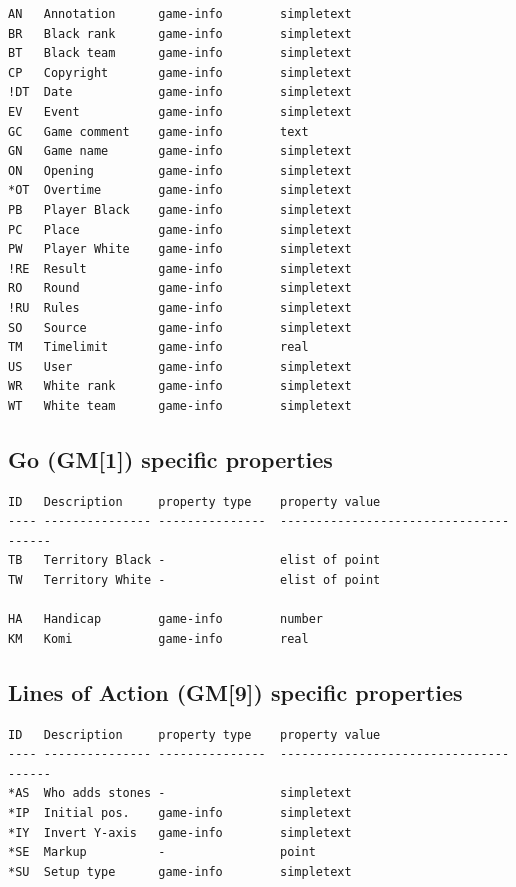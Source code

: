 \begin{verbatim}
AN   Annotation      game-info        simpletext
BR   Black rank      game-info        simpletext
BT   Black team      game-info        simpletext
CP   Copyright       game-info        simpletext
!DT  Date            game-info        simpletext
EV   Event           game-info        simpletext
GC   Game comment    game-info        text
GN   Game name       game-info        simpletext
ON   Opening         game-info        simpletext
*OT  Overtime        game-info        simpletext
PB   Player Black    game-info        simpletext
PC   Place           game-info        simpletext
PW   Player White    game-info        simpletext
!RE  Result          game-info        simpletext
RO   Round           game-info        simpletext
!RU  Rules           game-info        simpletext
SO   Source          game-info        simpletext
TM   Timelimit       game-info        real
US   User            game-info        simpletext
WR   White rank      game-info        simpletext
WT   White team      game-info        simpletext
\end{verbatim}

\subsection{Go (GM{[}1{]}) specific
properties}\label{go-gm1-specific-properties}

\begin{verbatim}
ID   Description     property type    property value
---- --------------- ---------------  --------------------------------------
TB   Territory Black -                elist of point
TW   Territory White -                elist of point

HA   Handicap        game-info        number
KM   Komi            game-info        real
\end{verbatim}

\subsection{Lines of Action (GM{[}9{]}) specific
properties}\label{lines-of-action-gm9-specific-properties}

\begin{verbatim}
ID   Description     property type    property value
---- --------------- ---------------  --------------------------------------
*AS  Who adds stones -                simpletext
*IP  Initial pos.    game-info        simpletext
*IY  Invert Y-axis   game-info        simpletext
*SE  Markup          -                point
*SU  Setup type      game-info        simpletext
\end{verbatim}

